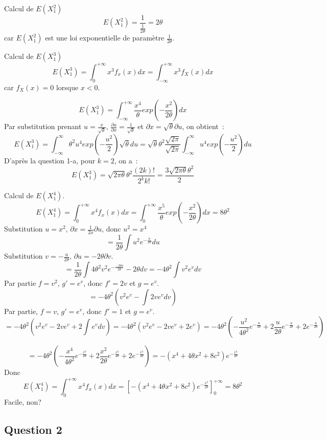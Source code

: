 \documentclass[]{book}
\theoremstyle{definition}
\begin{document}
Calcul de $E(X_1^2)$
$$
E(X_1^2) = \frac{1}{\frac{1}{2\theta}} = {2\theta}
$$
car $E(X_1^2)$ est une loi exponentielle de param\`etre $\frac{1}{2\theta}$.


Calcul de $E(X_1^3)$
$$
E(X_1^3) = \int_{0}^{+\infty} x^3 f_{x}(x) dx = \int_{-\infty}^{+\infty} x^3 f_{X}(x) dx
$$
car $f_{X}(x) = 0$ lorsque $x < 0$.

$$
E(X_1^3) = \int_{-\infty}^{+\infty} \frac{x^4}{\theta} exp \left( -\frac{x^2}{2\theta}\right) dx
$$
Par substitution prenant $u = \frac{x}{\sqrt{\theta}}$, $\frac{\partial u}{\partial x} = \frac{1}{\sqrt{\theta}}$ et ${\partial x} = \sqrt{\theta}{\partial u}$, on obtient~:
$$
E(X_1^3) = \int_{-\infty}^{\infty} \theta^2 u^4 exp \left( -\frac{u^2}{2}\right) \sqrt{\theta} du = \sqrt{\theta}\theta^2 \frac{\sqrt{2\pi}}{\sqrt{2\pi}} \int_{-\infty}^{\infty} u^4 exp \left( -\frac{u^2}{2}\right)  du 
$$
D'apr\`es la question 1-a, pour $k=2$, on a~:
$$
E(X_1^3) = \sqrt{2\pi\theta}\theta^2\frac{(2k)!}{2^k k!} = \frac{3\sqrt{2\pi\theta}\theta^2}{2} 
$$

Calcul de $E(X_1^4)$.
$$
E(X_1^4) = \int_{0}^{+\infty} x^4 f_{x}(x) dx = \int_{0}^{+\infty} \frac{x^5}{\theta} exp \left( -\frac{x^2}{2\theta}\right) dx = 8\theta^2 
$$
Substitution $u=x^2$, $\partial x = \frac{1}{2x}\partial u$, donc $u^2 = x^4$
$$
= \frac{1}{2\theta} \int u^2e^{-\frac{u}{2\theta}}  du
$$
Substitution $v = -\frac{u}{2\theta}$, $\partial u = -{2\theta} \partial v$.
$$
= \frac{1}{2\theta} \int 4\theta^2 v^2 e^{-\frac{-2\theta v}{2\theta}}  -{2\theta} dv = -4\theta^2 \int v^2 e^{v} dv
$$
Par partie $f=v^2$, $g'=e^v$, donc $f'=2v$ et $g=e^v$.
$$
= -4\theta^2 \left(v^2e^{v} - \int 2ve^v dv \right)
$$
Par partie, $f=v$, $g'=e^v$, donc $f'=1$ et $g=e^v$.
$$
= -4\theta^2 \left(v^2e^{v} - 2ve^v + 2\int e^v dv \right) 
= -4\theta^2 \left(v^2e^{v} - 2ve^v + 2e^v  \right) 
= -4\theta^2 \left(-\frac{u^2}{4\theta^2} e^{-\frac{u}{2\theta}} + 2 \frac{u}{2\theta} e^{-\frac{u}{2\theta}} + 2 e^{-\frac{u}{2\theta}} \right)
$$

$$
= -4\theta^2 \left(-\frac{x^4}{4\theta^2} e^{-\frac{x^2}{2\theta}} + 2 \frac{x^2}{2\theta} e^{-\frac{x^2}{2\theta}} + 2 e^{-\frac{x^2}{2\theta}} \right) = -(x^4 + 4\theta x^2 +8c^2) e^{-\frac{x^2}{2\theta}}
$$
Donc 
$$
E(X_1^4) = \int_{0}^{+\infty} x^4 f_{x}(x) dx = \left[ -(x^4 + 4\theta x^2 +8c^2) e^{-\frac{x^2}{2\theta}} \right]_{0}^{+\infty} = 8\theta^2
$$
Facile, non?



\subsection*{Question 2}
\end{document}
